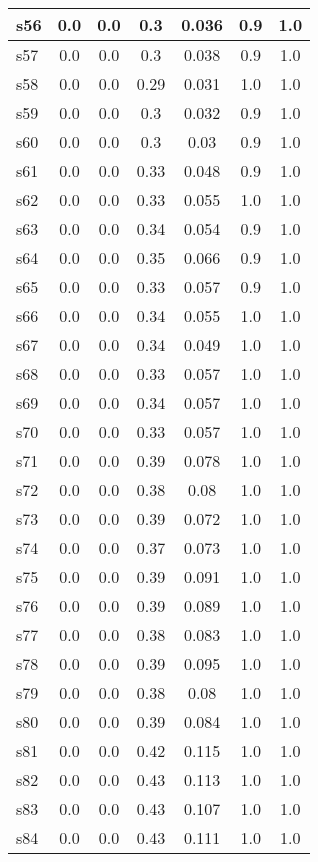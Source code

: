 \documentclass{article}
\begin{document}
\begin{tabular}{|l|c|c|c|c|c|c|}
\hline
s56 &0.0 & 0.0 & 0.3 & 0.036 & 0.9 & 1.0\\
\hline
s57 &0.0 & 0.0 & 0.3 & 0.038 & 0.9 & 1.0\\
\hline
s58 &0.0 & 0.0 & 0.29 & 0.031 & 1.0 & 1.0\\
\hline
s59 &0.0 & 0.0 & 0.3 & 0.032 & 0.9 & 1.0\\
\hline
s60 &0.0 & 0.0 & 0.3 & 0.03 & 0.9 & 1.0\\
\hline
s61 &0.0 & 0.0 & 0.33 & 0.048 & 0.9 & 1.0\\
\hline
s62 &0.0 & 0.0 & 0.33 & 0.055 & 1.0 & 1.0\\
\hline
s63 &0.0 & 0.0 & 0.34 & 0.054 & 0.9 & 1.0\\
\hline
s64 &0.0 & 0.0 & 0.35 & 0.066 & 0.9 & 1.0\\
\hline
s65 &0.0 & 0.0 & 0.33 & 0.057 & 0.9 & 1.0\\
\hline
s66 &0.0 & 0.0 & 0.34 & 0.055 & 1.0 & 1.0\\
\hline
s67 &0.0 & 0.0 & 0.34 & 0.049 & 1.0 & 1.0\\
\hline
s68 &0.0 & 0.0 & 0.33 & 0.057 & 1.0 & 1.0\\
\hline
s69 &0.0 & 0.0 & 0.34 & 0.057 & 1.0 & 1.0\\
\hline
s70 &0.0 & 0.0 & 0.33 & 0.057 & 1.0 & 1.0\\
\hline
s71 &0.0 & 0.0 & 0.39 & 0.078 & 1.0 & 1.0\\
\hline
s72 &0.0 & 0.0 & 0.38 & 0.08 & 1.0 & 1.0\\
\hline
s73 &0.0 & 0.0 & 0.39 & 0.072 & 1.0 & 1.0\\
\hline
s74 &0.0 & 0.0 & 0.37 & 0.073 & 1.0 & 1.0\\
\hline
s75 &0.0 & 0.0 & 0.39 & 0.091 & 1.0 & 1.0\\
\hline
s76 &0.0 & 0.0 & 0.39 & 0.089 & 1.0 & 1.0\\
\hline
s77 &0.0 & 0.0 & 0.38 & 0.083 & 1.0 & 1.0\\
\hline
s78 &0.0 & 0.0 & 0.39 & 0.095 & 1.0 & 1.0\\
\hline
s79 &0.0 & 0.0 & 0.38 & 0.08 & 1.0 & 1.0\\
\hline
s80 &0.0 & 0.0 & 0.39 & 0.084 & 1.0 & 1.0\\
\hline
s81 &0.0 & 0.0 & 0.42 & 0.115 & 1.0 & 1.0\\
\hline
s82 &0.0 & 0.0 & 0.43 & 0.113 & 1.0 & 1.0\\
\hline
s83 &0.0 & 0.0 & 0.43 & 0.107 & 1.0 & 1.0\\
\hline
s84 &0.0 & 0.0 & 0.43 & 0.111 & 1.0 & 1.0\\

\end{tabular}
\end{document}
